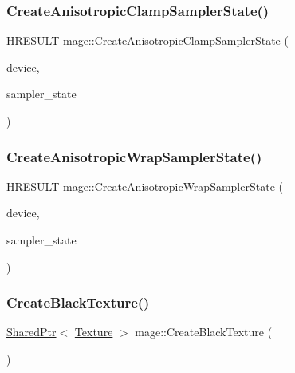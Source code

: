 \hypertarget{namespacemage_af85f5fe2b35fb8992c3eea69e87ad039}{}\label{namespacemage_af85f5fe2b35fb8992c3eea69e87ad039} 
\subsubsection{\texorpdfstring{Create\+Anisotropic\+Clamp\+Sampler\+State()}{CreateAnisotropicClampSamplerState()}}
{\footnotesize\ttfamily H\+R\+E\+S\+U\+LT mage\+::\+Create\+Anisotropic\+Clamp\+Sampler\+State (\begin{DoxyParamCaption}\item[{I\+D3\+D11\+Device2 $\ast$}]{device,  }\item[{I\+D3\+D11\+Sampler\+State $\ast$$\ast$}]{sampler\+\_\+state }\end{DoxyParamCaption})}

\hypertarget{namespacemage_a38bc123db04b8434276d3a350b5acc7f}{}\label{namespacemage_a38bc123db04b8434276d3a350b5acc7f} 
\subsubsection{\texorpdfstring{Create\+Anisotropic\+Wrap\+Sampler\+State()}{CreateAnisotropicWrapSamplerState()}}
{\footnotesize\ttfamily H\+R\+E\+S\+U\+LT mage\+::\+Create\+Anisotropic\+Wrap\+Sampler\+State (\begin{DoxyParamCaption}\item[{I\+D3\+D11\+Device2 $\ast$}]{device,  }\item[{I\+D3\+D11\+Sampler\+State $\ast$$\ast$}]{sampler\+\_\+state }\end{DoxyParamCaption})}

\hypertarget{namespacemage_a67c2c82133bfbce0b54db0faee82f79f}{}\label{namespacemage_a67c2c82133bfbce0b54db0faee82f79f} 
\subsubsection{\texorpdfstring{Create\+Black\+Texture()}{CreateBlackTexture()}}
{\footnotesize\ttfamily \hyperlink{namespacemage_a1e01ae66713838a7a67d30e44c67703e}{Shared\+Ptr}$<$ \hyperlink{classmage_1_1_texture}{Texture} $>$ mage\+::\+Create\+Black\+Texture (\begin{DoxyParamCaption}{ }\end{DoxyParamCaption})}

